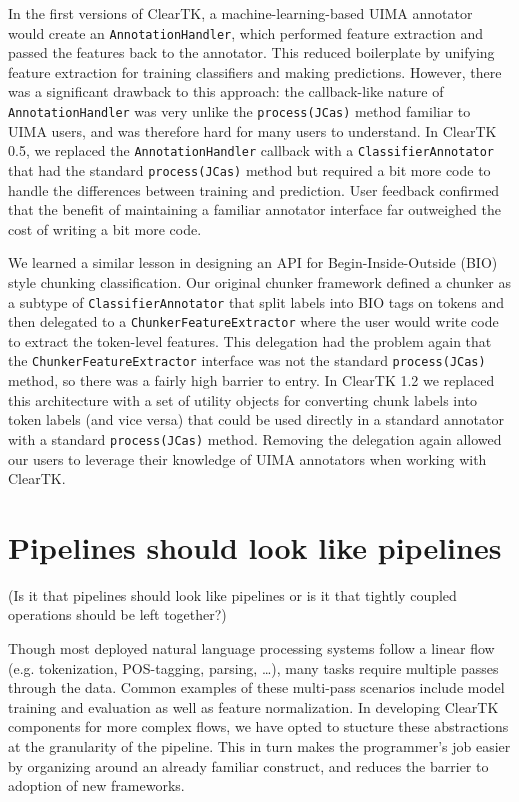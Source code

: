 \documentclass[10pt, a4paper]{article}
\newcommand{\code}[1]{\texttt{\small #1}}
\begin{document}
In the first versions of ClearTK, a machine-learning-based UIMA annotator would create an \code{AnnotationHandler}, which performed feature extraction and passed the features back to the annotator.
This reduced boilerplate by unifying feature extraction for training classifiers and making predictions.
However, there was a significant drawback to this approach:
the callback-like nature of \code{AnnotationHandler} was very unlike the \code{process(JCas)} method familiar to UIMA users, and was therefore hard for many users to understand.
In ClearTK 0.5, we replaced the \code{AnnotationHandler} callback with a \code{ClassifierAnnotator} that had the standard \code{process(JCas)} method but required a bit more code to handle the differences between training and prediction.
User feedback confirmed that the benefit of maintaining a familiar annotator interface far outweighed the cost of writing a bit more code.

We learned a similar lesson in designing an API for Begin-Inside-Outside (BIO) style chunking classification.
Our original chunker framework defined a chunker as a subtype of \code{ClassifierAnnotator} that split labels into BIO tags on tokens and then delegated to a \code{ChunkerFeatureExtractor} where the user would write code to extract the token-level features.
This delegation had the problem again that the \code{ChunkerFeatureExtractor} interface was not the standard \code{process(JCas)} method, so there was a fairly high barrier to entry.
In ClearTK 1.2 we replaced this architecture with a set of utility objects for converting chunk labels into token labels (and vice versa) that could be used directly in a standard annotator with a standard \code{process(JCas)} method.
Removing the delegation again allowed our users to leverage their knowledge of UIMA annotators when working with ClearTK.


\section{Pipelines should look like pipelines}

(Is it that pipelines should look like pipelines or is it that tightly coupled operations should be left together?)

Though most deployed natural language processing systems follow a linear flow (e.g. tokenization, POS-tagging, parsing, \ldots), many tasks require multiple passes through the data.  Common examples of these multi-pass scenarios include model training and evaluation as well as feature normalization.  In developing ClearTK components for more complex flows, we have opted to stucture these abstractions at the granularity of the pipeline.  This in turn makes the programmer's job easier by organizing around an already familiar construct, and reduces the barrier to adoption of new frameworks.
\end{document}
